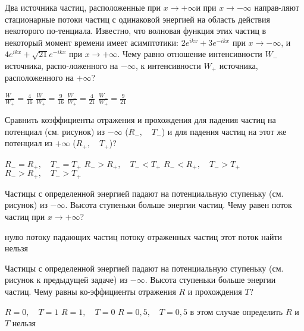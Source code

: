 \documentclass[11pt,a4paper]{exam}
\begin{document}
\begin{questions}
\question Два источника частиц, расположенные при $x \to  + \infty $и при $x \to  - \infty $ направ-ляют стационарные потоки частиц с одинаковой энергией на область действия некоторого по-тенциала. Известно, что волновая функция этих частиц в некоторый момент времени имеет асимптотики: $2{e^{ikx}} + 3{e^{ - ikx}}$ при $x \to  - \infty $, и $4{e^{ikx}} + \sqrt {21} {e^{ - ikx}}$ при $x \to  + \infty $. Чему равно отношение интенсивности ${W_ - }$ источника, распо-ложенного на $ - \infty $, к интенсивности ${W_ + }$ источника, расположенного на $ + \infty $?
\begin{choices}
\choice $\frac{{{W_ - }}}{{{W_ + }}} = \frac{4}{{16}}$     
\choice $\frac{{{W_ - }}}{{{W_ + }}} = \frac{9}{{16}}$     
\choice $\frac{{{W_ - }}}{{{W_ + }}} = \frac{4}{{21}}$     
\choice $\frac{{{W_ - }}}{{{W_ + }}} = \frac{9}{{21}}$
\end{choices}

\question Сравнить коэффициенты отражения и прохождения для падения частиц на потенциал (см. рисунок) из $ - \infty $ (${R_ - },\quad {T_ - }$) и для падения частиц на этот же потенциал из $ + \infty $ (${R_ + },\quad {T_ + }$)?
\begin{choices}
\choice ${R_ - } = {R_ + },\quad {T_ - } = {T_ + }$        
\choice ${R_ - } > {R_ + },\quad {T_ - } < {T_ + }$
\choice ${R_ - } < {R_ + },\quad {T_ - } > {T_ + }$        
\choice ${R_ - } > {R_ + },\quad {T_ - } > {T_ + }$
\end{choices}

\question Частицы с определенной энергией падают на потенциальную ступеньку (см. рисунок) из $ - \infty $. Высота ступеньки больше энергии частиц. Чему равен поток частиц при $x \to  + \infty $?
\begin{choices}
\choice нулю           
\choice потоку падающих частиц
\choice потоку отраженных частиц      
\choice этот поток найти нельзя
\end{choices}

\question Частицы с определенной энергией падают на потенциальную ступеньку (см. рисунок к предыдущей задаче) из $ - \infty $. Высота ступеньки больше энергии частиц. Чему равны ко-эффициенты отражения $R$ и прохождения $T$?
\begin{choices}
\choice $R = 0,\quad T = 1$         
\choice $R = 1,\quad T = 0$
\choice $R = 0,5,\quad T = 0,5$        
\choice в этом случае определить $R$ и $T$ нельзя
\end{choices}

\end{questions}
\end{document}
